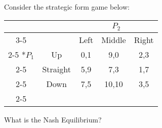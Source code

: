 
\begin{question}
  Consider the strategic form game below:

  \begin{table}[h!]
    \begin{center}
    \begin{tabular}{*{5}{c|}}
      \multicolumn{2}{c}{} & \multicolumn{3}{c}{$P_2$} \\\cline{3-5}
      \multicolumn{1}{c}{} &         & Left & Middle & Right \\\cline{2-5}
      \multirow{3}*{$P_1$}& Up       & 0,1  & 9,0    & 2,3 \\\cline{2-5}
                          & Straight & 5,9  & 7,3    & 1,7 \\\cline{2-5}
                          & Down     & 7,5  & 10,10  & 3,5 \\\cline{2-5}
    \end{tabular}
    \end{center}
  \end{table}
  What is the Nash Equilibrium?
  \begin{tasks}
    \task {}
    \task {}
    \task {}
    \task {}
  \end{tasks}
\end{question}


